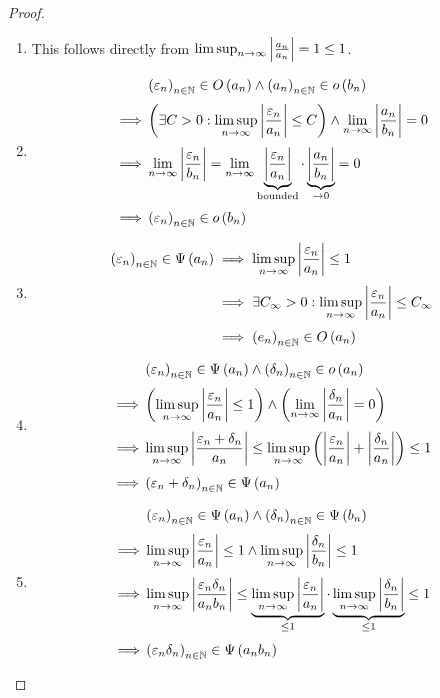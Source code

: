 \begin{proof} ~
  \begin{enumerate}
    \item

      This follows directly from $\limsup_{n\to\infty} \left|{\frac{a_n}{a_n}}\right| = 1 \le 1$.

    \item \label{proof:littleo_rule}

      \begin{align}
        & \seq{\epsilon_n}\in\bigo{a_n} \land \seq{a_n} \in \littleo{b_n} \nl
        \implies & \left(\exists C > 0: \limsup_{n\to\infty} \abs{\frac{\epsilon_n}{a_n}} \le C\right) \land \lim_{n\to\infty} \abs{\frac{a_n}{b_n}} = 0 \nl
        \implies & \lim_{n\to\infty} \abs{\frac{\epsilon_n}{b_n}} = \lim_{n\to\infty} \underbrace{\abs{\frac{\epsilon_n}{a_n}}}_{\text{bounded}} \cdot \underbrace{\abs{\frac{a_n}{b_n}}}_{\to 0} = 0 \nl
        \implies & \seq{\epsilon_n} \in \littleo{b_n}
      \end{align}

    \item

      \begin{align}
        \seq{\epsilon_n} \in \bigpsi{a_n} & \implies \limsup_{n\to\infty} \abs{\frac{\epsilon_n}{a_n}} \le 1 \nl
                                          & \implies \exists C_\infty > 0 : \limsup_{n\to\infty} \abs{\frac{\epsilon_n}{a_n}} \le C_\infty \nl
                                          & \implies \seq{e_n} \in \bigo{a_n}
      \end{align}

    \item

      \begin{align}
        & \seq{\epsilon_n} \in \bigpsi{a_n} \land \seq{\delta_n} \in \littleo{a_n} \nl
        \implies& \left(\limsup_{n\to\infty} \abs{\frac{\epsilon_n}{a_n}} \le 1\right) \land \left(\lim_{n\to\infty} \abs{\frac{\delta_n}{a_n}} = 0\right) \nl
        \implies& \limsup_{n\to\infty} \abs{\frac{\epsilon_n+\delta_n}{a_n}} \le \limsup_{n\to\infty} \left(\abs{\frac{\epsilon_n}{a_n}}+\abs{\frac{\delta_n}{a_n}}\right) \le 1 \nl
        \implies& \seq{\epsilon_n+\delta_n} \in \bigpsi{a_n}
      \end{align}

    \item

      \begin{align}
        & \seq{\epsilon_n} \in \bigpsi{a_n} \land \seq{\delta_n} \in \bigpsi{b_n} \nl
        \implies & \limsup_{n\to\infty} \abs{\frac{\epsilon_n}{a_n}} \le 1 \land \limsup_{n\to\infty} \abs{\frac{\delta_n}{b_n}} \le 1 \nl
        \implies & \limsup_{n\to\infty} \abs{\frac{\epsilon_n\delta_n}{a_nb_n}} \le \underbrace{\limsup_{n\to\infty} \abs{\frac{\epsilon_n}{a_n}}}_{\le 1} \cdot \underbrace{\limsup_{n\to\infty} \abs{\frac{\delta_n}{b_n}}}_{\le 1} \le 1 \nl
        \implies & \seq{\epsilon_n\delta_n} \in \bigpsi{a_nb_n}
      \end{align}


\end{enumerate}
\end{proof}
